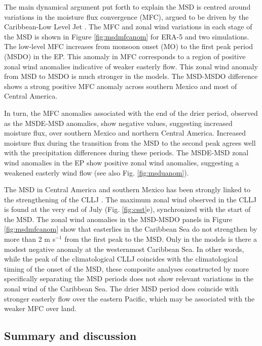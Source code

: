 The main dynamical argument put forth to explain the MSD is centred around variations in the moisture flux convergence (MFC), argued to be driven by the Caribbean-Low Level Jet \citep[see e.g.][]{gamble2008,herrera2015,martinez2019}. The MFC and zonal wind variations in each stage of the MSD is shown in Figure \ref{fig:msdmfcanom} for ERA-5 and two simulations. The low-level MFC increases from monsoon onset (MO) to the first peak period (MSDO) in the EP. This anomaly in MFC corresponds to a region of positive zonal wind anomalies indicative of weaker easterly flow.
 This zonal wind anomaly from MSD to MSDO is much stronger in the models.  
The MSD-MSDO difference shows a strong positive MFC anomaly across southern Mexico and most of Central America. 

In turn, the MFC anomalies associated with the end of the drier period, observed as the MSDE-MSD anomalies,  show negative values, suggesting increased moisture flux, over southern Mexico and northern Central America.
Increased moisture flux during the transition from the MSD to the second peak agrees well with the precipitation differences during these periods.  The MSDE-MSD zonal wind anomalies in the EP show positive zonal wind anomalies, suggesting a weakened easterly wind flow (see also Fig. \ref{fig:msduanom}). 

The MSD in Central America and southern Mexico has been strongly linked to the strengthening of the CLLJ \citep{herrera2015}. The maximum zonal wind observed in the CLLJ is found at the very end of July (Fig. \ref{fig:csst}e), synchronized with the start of the MSD. 
The zonal wind anomalies in the MSD-MSDO panels in Figure \ref{fig:msdmfcanom} show that easterlies in the Caribbean Sea do not strengthen by more than 2 m s$^{-1}$ from the first peak to the MSD. Only in the models is there a modest negative anomaly at the westernmost Caribbean Sea. In other words, while the peak of the climatological CLLJ coincides with the climatological timing of the onset of the MSD, these composite analyses constructed by more specifically separating the MSD periods does not show relevant variations in the zonal wind of the Caribbean Sea. 
The drier MSD period does coincide with stronger easterly flow over the eastern Pacific, which may be associated with the weaker MFC over land. %

\subsection{Summary and discussion}\label{sq:sumdiscuss}


